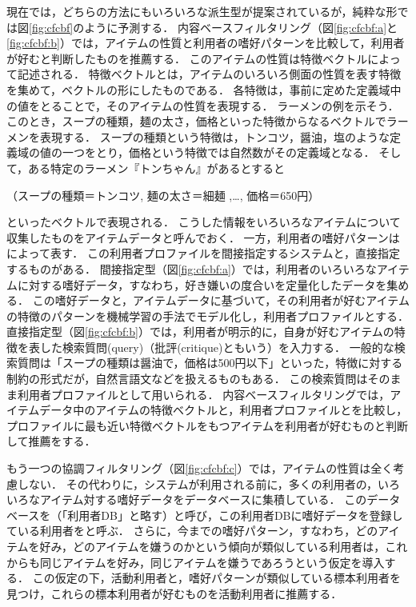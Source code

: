 現在では，どちらの方法にもいろいろな派生型が提案されているが，純粋な形では図\ref{fig:cfcbf}のように予測する．
内容ベースフィルタリング（図\ref{fig:cfcbf:a}と\ref{fig:cfcbf:b}）では，アイテムの性質と利用者の嗜好パターンを比較して，利用者が好むと判断したものを推薦する．
このアイテムの性質は特徴ベクトルによって記述される．
特徴ベクトルとは，アイテムのいろいろ側面の性質を表す特徴を集めて，ベクトルの形にしたものである．
各特徴は，事前に定めた定義域中の値をとることで，そのアイテムの性質を表現する．
ラーメンの例を示そう．このとき，スープの種類，麺の太さ，価格といった特徴からなるベクトルでラーメンを表現する．
スープの種類という特徴は，トンコツ，醤油，塩のような定義域の値の一つをとり，価格という特徴では自然数がその定義域となる．
そして，ある特定のラーメン『トンちゃん』があるとすると
\begin{center}
\footnotesize
（スープの種類＝トンコツ, 麺の太さ＝細麺 ,…, 価格＝650円）
\end{center}
といったベクトルで表現される．
こうした情報をいろいろなアイテムについて収集したものをアイテムデータと呼んでおく．
一方，利用者の嗜好パターンはによって表す．
この利用者プロファイルを間接指定するシステムと，直接指定するものがある．
間接指定型（図\ref{fig:cfcbf:a}）では，利用者のいろいろなアイテムに対する嗜好データ，すなわち，好き嫌いの度合いを定量化したデータを集める．
この嗜好データと，アイテムデータに基づいて，その利用者が好むアイテムの特徴のパターンを機械学習の手法でモデル化し，利用者プロファイルとする．
直接指定型（図\ref{fig:cfcbf:b}）では，利用者が明示的に，自身が好むアイテムの特徴を表した検索質問(query)（批評(critique)ともいう）を入力する．
一般的な検索質問は「スープの種類は醤油で，価格は500円以下」といった，特徴に対する制約の形式だが，自然言語文などを扱えるものもある．
この検索質問はそのまま利用者プロファイルとして用いられる．
内容ベースフィルタリングでは，アイテムデータ中のアイテムの特徴ベクトルと，利用者プロファイルとを比較し，プロファイルに最も近い特徴ベクトルをもつアイテムを利用者が好むものと判断して推薦をする．

もう一つの協調フィルタリング（図\ref{fig:cfcbf:c}）では，アイテムの性質は全く考慮しない．
その代わりに，システムが利用される前に，多くの利用者の，いろいろなアイテム対する嗜好データをデータベースに集積している．
このデータベースを（「利用者DB」と略す）と呼び，この利用者DBに嗜好データを登録している利用者をと呼ぶ．
さらに，今までの嗜好パターン，すなわち，どのアイテムを好み，どのアイテムを嫌うのかという傾向が類似している利用者は，これからも同じアイテムを好み，同じアイテムを嫌うであろうという仮定を導入する．
この仮定の下，活動利用者と，嗜好パターンが類似している標本利用者を見つけ，これらの標本利用者が好むものを活動利用者に推薦する．

